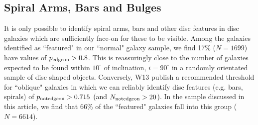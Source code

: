 \documentclass[usenatbib]{mn2e}
\newcommand{\comment}[2][todo]{{\color{#1}[[{\bf #2}]]}}
\begin{document}


\subsection{Spiral Arms, Bars and Bulges}
 
  It is only possible to identify spiral arms, bars and other disc features in disc galaxies which are sufficiently face-on for these to be visible.  Among the galaxies identified as ``featured" in our ``normal" galaxy sample, we find {17\% ($N=1 699$)} have values of $p_{\rm edge on}>0.8$. This is reassuringly close to the number of galaxies expected to be found within $10^\circ$ of inclination, $i=90^\circ$ in a randomly orientated sample of disc shaped objects. %
Conversely, W13 publish a recommended threshold for ``oblique" galaxies in which we can reliably identify disc features (e.g. bars, spirals) of $p_{\rm not edge on}>0.715$ (and $N_{\rm not edge on}>20$). In the sample discussed in this article, we find that {66}\% of the ``featured" galaxies fall into this group {($N=6 614$)}. 
 
\end{document}
